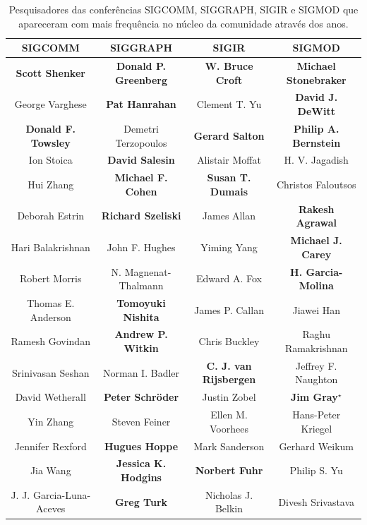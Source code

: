 \begin{table}[!hptb]
\centering
\caption{Pesquisadores das conferências SIGCOMM, SIGGRAPH, SIGIR e SIGMOD que apareceram com mais 
frequência no núcleo da comunidade através dos anos.}
\label{tab:authors_frequency_core_community_grupo2}
{\fontsize{9.2}{11}\selectfont
\begin{tabular}{|c|c|c|c|} \hline
\textbf{SIGCOMM} & \textbf{SIGGRAPH} & \textbf{SIGIR} & \textbf{SIGMOD}\\ \hline
\textbf{Scott Shenker} & \textbf{Donald P. Greenberg} & \textbf{W. Bruce Croft} & \textbf{Michael Stonebraker}\\ \hline
George Varghese & \textbf{Pat Hanrahan} & Clement T. Yu & \textbf{David J. DeWitt}\\ \hline
\textbf{Donald F. Towsley} & Demetri Terzopoulos & \textbf{Gerard Salton} & \textbf{Philip A. Bernstein}\\ \hline
Ion Stoica & \textbf{David Salesin} & Alistair Moffat & H. V. Jagadish\\ \hline
Hui Zhang & \textbf{Michael F. Cohen} & \textbf{Susan T. Dumais} & Christos Faloutsos\\ \hline
Deborah Estrin & \textbf{Richard Szeliski} & James Allan & \textbf{Rakesh Agrawal}\\ \hline
Hari Balakrishnan & John F. Hughes & Yiming Yang & \textbf{Michael J. Carey}\\ \hline
Robert Morris & N. Magnenat-Thalmann & Edward A. Fox & \textbf{H. Garcia-Molina}\\ \hline
Thomas E. Anderson & \textbf{Tomoyuki Nishita} & James P. Callan & Jiawei Han\\ \hline
Ramesh Govindan & \textbf{Andrew P. Witkin} & Chris Buckley & Raghu Ramakrishnan\\ \hline
Srinivasan Seshan & Norman I. Badler & \textbf{C. J. van Rijsbergen} & Jeffrey F. Naughton\\ \hline
David Wetherall & \textbf{Peter Schröder} & Justin Zobel & \textbf{Jim Gray}$^\star$\\ \hline
Yin Zhang & Steven Feiner & Ellen M. Voorhees & Hans-Peter Kriegel\\ \hline
Jennifer Rexford & \textbf{Hugues Hoppe} & Mark Sanderson & Gerhard Weikum\\ \hline
Jia Wang & \textbf{Jessica K. Hodgins} & \textbf{Norbert Fuhr} & Philip S. Yu\\ \hline
J. J. Garcia-Luna-Aceves & \textbf{Greg Turk} & Nicholas J. Belkin & Divesh Srivastava\\ \hline

\end{tabular}}
\end{table}
